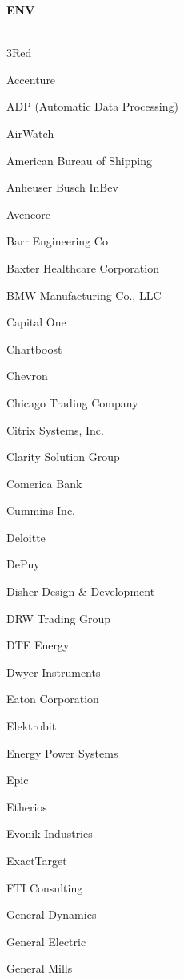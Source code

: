 \documentclass[twoside]{article}
\begin{document}
\begin{center}
\begin{multicols}{5}
        \vspace{1em}
        {\fontsize{14}{16}\selectfont \bf ENV}\\
        \vspace{-1em}
        ~\hrulefill~
        \vspace{-.9em}
        \begin{FlushLeft}
        \begin{compactitem}
        \item 3Red
\item Accenture
\item ADP (Automatic Data Processing)
\item AirWatch
\item American Bureau of Shipping
\item Anheuser Busch InBev
\item Avencore
\item Barr Engineering Co
\item Baxter Healthcare Corporation
\item BMW Manufacturing Co., LLC
\item Capital One
\item Chartboost
\item Chevron
\item Chicago Trading Company
\item Citrix Systems, Inc.
\item Clarity Solution Group
\item Comerica Bank
\item Cummins Inc.
\item Deloitte
\item DePuy
\item Disher Design \& Development
\item DRW Trading Group
\item DTE Energy
\item Dwyer Instruments
\item Eaton Corporation
\item Elektrobit
\item Energy Power Systems
\item Epic
\item Etherios
\item Evonik Industries
\item ExactTarget
\item FTI Consulting
\item General Dynamics
\item General Electric
\item General Mills

\end{compactitem}
\end{FlushLeft}
\end{multicols}
\end{center}
\end{document}
